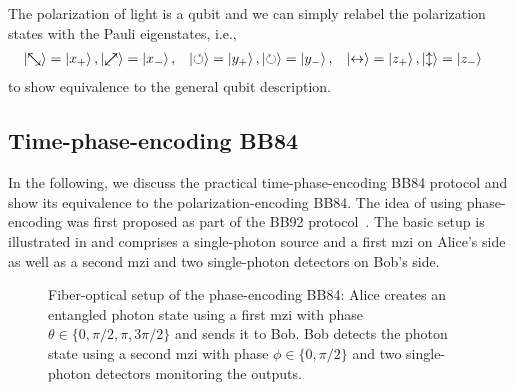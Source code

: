 The polarization of light is a qubit and we can simply relabel the polarization states with the Pauli eigenstates, i.e.,
\begin{align}
	\ket{\nwsearrow}
	=
	\ket{x_+},
	&
	\ket{\neswarrow}
	=
	\ket{x_-},
	&
	\ket{\circlearrowleft}
	=
	\ket{y_+},
	&
	\ket{\circlearrowright}
	=
	\ket{y_-},
	&
	\ket{\leftrightarrow}
	=
	\ket{z_+},
	&
	\ket{\updownarrow}
	=
	\ket{z_-}
\end{align}
to show equivalence to the general qubit description.

\FloatBarrier
\subsection{Time-phase-encoding BB84}

In the following, we discuss the practical time-phase-encoding BB84 protocol and show its equivalence to the polarization-encoding BB84.
The idea of using phase-encoding was first proposed as part of the BB92 protocol~\cite{Bennett1992}.
The basic setup is illustrated in  and comprises a single-photon source and a first \gls{mzi} on Alice's side as well as a second \gls{mzi} and two single-photon detectors on Bob's side.
\begin{figure}[htb]
	\centering
	
	\caption{Fiber-optical setup of the phase-encoding BB84: Alice creates an entangled photon state using a first \gls{mzi} with phase $\theta\in\{0,\pi/2,\pi,3\pi/2\}$ and sends it to Bob. Bob detects the photon state using a second \gls{mzi} with phase $\phi\in\{0,\pi/2\}$ and two single-photon detectors monitoring the outputs.}\label{fig:qubit_time_phase_active}
\end{figure}

